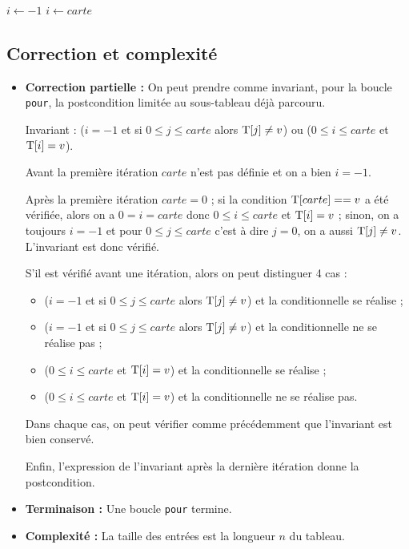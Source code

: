 \begin{algorithm}[H]
$i \leftarrow -1$\;
{ 
  {  $i\leftarrow carte$\;  }
}
\end{algorithm}

\subsection{Correction et complexité}

\begin{itemize}
	\item {\bfseries Correction partielle :} On peut prendre comme invariant, pour la boucle \texttt{pour}, la postcondition limitée au sous-tableau déjà parcouru.
	
	Invariant : ($i=-1$ et si $0\leqslant j\leqslant carte$ alors $\text{\normalfont T}[j]\ne v$) ou ($0\leqslant i \leqslant carte$ et $\text{\normalfont T}[i]=v$).
	
	Avant la première itération $carte$ n'est pas définie et on a bien $i=-1$.
	
	Après la première itération $carte=0$ ; si la condition $\text{\normalfont T}[carte]==v$ a été vérifiée, alors on a $0= i = carte$ donc $0\leqslant i \leqslant carte$ et $\text{\normalfont T}[i]=v$ ; sinon, on a toujours $ i = -1$ et pour $0\leqslant j\leqslant carte$ c'est à dire $j=0$, on a aussi  $\text{\normalfont T}[j]\ne v$. L'invariant est donc vérifié.
	
	S'il est vérifié avant une itération, alors on peut distinguer 4 cas :
	\begin{itemize}
		\item ($i=-1$ et si $0\leqslant j\leqslant carte$ alors $\text{\normalfont T}[j]\ne v$) et la conditionnelle se réalise ;
		\item ($i=-1$ et si $0\leqslant j\leqslant carte$ alors $\text{\normalfont T}[j]\ne v$) et la conditionnelle ne se réalise pas ;
		\item ($0\leqslant i \leqslant carte$ et $\text{\normalfont T}[i]=v$)  et la conditionnelle se réalise ;
		\item ($0\leqslant i \leqslant carte$ et $\text{\normalfont T}[i]=v$)  et la conditionnelle ne se réalise pas.
	\end{itemize}
	
	Dans chaque cas, on peut vérifier comme précédemment que l'invariant est bien conservé.
	
	Enfin, l'expression de l'invariant après la dernière itération donne la postcondition.
	\item {\bfseries Terminaison :} Une boucle \texttt{pour} termine.
	\item {\bfseries Complexité :} La taille des entrées est la longueur $n$ du tableau.
	

\end{itemize}
